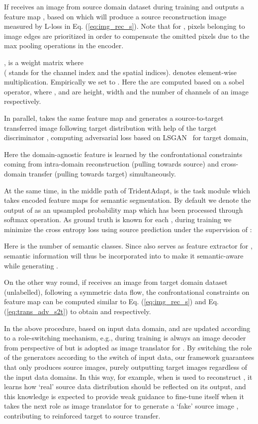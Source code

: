\documentclass{bmvc2k}
\newcommand{\Eq}[1]{Eq. (\ref{eq:#1})}
\begin{document}
If  receives an image  from source domain dataset during training and outputs a feature map , based on which  will produce a source reconstruction image  measured by L-loss  in \Eq{img_rec_s}. Note that for , pixels belonging to image edges are prioritized in order to compensate the omitted pixels due to the max pooling operations in the encoder.  


 , is a weight matrix where \\ 
( stands for the channel index and  the spatial indices).  denotes element-wise multiplication. Empirically we set  to .
Here the  are computed based on a sobel operator, where ,  and  are height, width and the number of channels of an image  respectively.

In parallel,  takes the same feature map  and generates a source-to-target transferred image  following target distribution with help of the target discriminator , computing adversarial loss  based on LSGAN~\cite{mao2017least} for target domain,


\noindent Here the domain-agnostic feature is learned by the confrontational constraints coming from intra-domain reconstruction (pulling towards source) and cross-domain transfer (pulling towards target) simultaneously.

At the same time, in the middle path of TridentAdapt,  is the task module which takes encoded feature maps for semantic segmentation. By default we denote the output of  as an upsampled probability map which has been processed through softmax operation. As ground truth is known for each , during training we minimize the cross entropy loss  using source prediction  under the supervision of :


\noindent 

Here  is the number of semantic classes. Since  also serves as feature extractor for , semantic information will thus be incorporated into  to make it semantic-aware while generating . 




On the other way round, if  receives an image  from target domain dataset (unlabelled), following a symmetric data flow, the confrontational constraints on feature map  can be computed similar to \Eq{img_rec_s} and \Eq{trans_adv_s2t} to obtain  and  respectively.




In the above procedure, based on input data domain,  and  are updated according to a role-switching mechanism, e.g., during training  is always an image decoder from perspective of  but is adopted as image translator for . By switching the role of the generators according to the switch of input data, our framework guarantees that  only produces source images,  purely outputting target images regardless of the input data domains. In this way, for example, when  is used to reconstruct , it learns how `real' source data distribution should be reflected on its output, and this knowledge is expected to provide weak guidance to fine-tune itself when it takes the next role as image translator for  to generate a `fake' source image , 
contributing to reinforced target to source transfer. 
\end{document}
